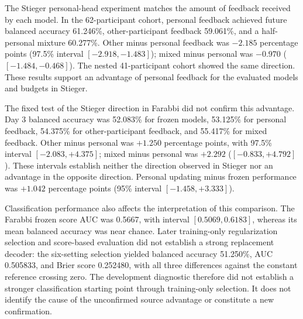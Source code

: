 \documentclass[11pt,a4paper]{article}
\begin{document}
The Stieger personal-head experiment matches the amount of feedback received by each model. In the 62-participant cohort, personal feedback achieved future balanced accuracy 61.246\%, other-participant feedback 59.061\%, and a half-personal mixture 60.277\%. Other minus personal feedback was $-2.185$ percentage points (97.5\% interval $[-2.918,-1.483]$); mixed minus personal was $-0.970$ ($[-1.484,-0.468]$). The nested 41-participant cohort showed the same direction. These results support an advantage of personal feedback for the evaluated models and budgets in Stieger.

The fixed test of the Stieger direction in Farabbi did not confirm this advantage. Day 3 balanced accuracy was 52.083\% for frozen models, 53.125\% for personal feedback, 54.375\% for other-participant feedback, and 55.417\% for mixed feedback. Other minus personal was $+1.250$ percentage points, with 97.5\% interval $[-2.083,+4.375]$; mixed minus personal was $+2.292$ ($[-0.833,+4.792]$). These intervals establish neither the direction observed in Stieger nor an advantage in the opposite direction. Personal updating minus frozen performance was $+1.042$ percentage points (95\% interval $[-1.458,+3.333]$).

Classification performance also affects the interpretation of this comparison. The Farabbi frozen score AUC was 0.5667, with interval $[0.5069,0.6183]$, whereas its mean balanced accuracy was near chance. Later training-only regularization selection and score-based evaluation did not establish a strong replacement decoder: the six-setting selection yielded balanced accuracy 51.250\%, AUC 0.505833, and Brier score 0.252480, with all three differences against the constant reference crossing zero. The development diagnostic therefore did not establish a stronger classification starting point through training-only selection. It does not identify the cause of the unconfirmed source advantage or constitute a new confirmation.
\end{document}
